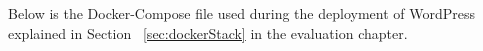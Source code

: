 \chapter{}\label{sec:appendixb}
\renewcommand{\thepage}{\thechapter-\arabic{page}}
\setcounter{page}{1}

Below is the Docker-Compose file used during the deployment of WordPress explained in Section ~\ref{sec:dockerStack} in the evaluation chapter.


